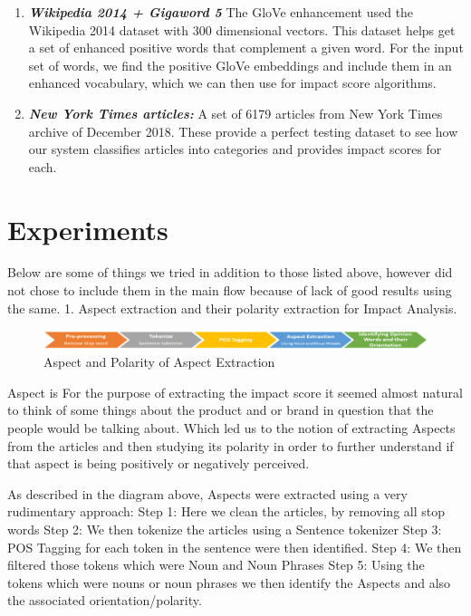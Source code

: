 \documentclass[paper=a4, fontsize=11pt]{scrartcl}
\numberwithin{equation}{section}		%
\numberwithin{figure}{section}			%
\numberwithin{table}{section}				%
\begin{document}
\begin {enumerate}
\item \textbf{\textit{Wikipedia 2014 + Gigaword 5}}
The GloVe enhancement used the Wikipedia 2014 dataset with 300 dimensional vectors. This dataset helps get a set of enhanced positive words that complement a given word. For the input set of words, we find the positive GloVe embeddings and include them in an enhanced vocabulary, which we can then use for impact score algorithms.

\item \textbf{\textit{New York Times articles:}}
A set of 6179 articles from New York Times archive of December 2018. These provide a perfect testing dataset to see how our system classifies articles into categories and provides impact scores for each.

\end {enumerate}

\section{Experiments}
Below are some of things we tried in addition to those listed above, however did not chose to include them in the main flow because of lack of good results using the same.
1. Aspect extraction and their polarity extraction for Impact Analysis.
\begin{figure}[H]
	\centering
 	 \includegraphics[width=0.6\linewidth]{Aspect_Extraction.png}
	  \caption{Aspect and Polarity of Aspect Extraction}
 	 \label{fig:Aspect Extraction.png}
\end{figure}
Aspect is
For the purpose of extracting the impact score it seemed almost natural to think of some things about the product and or brand in question that the people would be talking about. Which led us to the notion of extracting Aspects from the articles and then studying its polarity in order to further understand if that aspect is being positively or negatively perceived.

As described in the diagram above, Aspects were extracted using a very rudimentary approach:
{Step 1: Here we clean the articles, by removing all stop words}
{Step 2: We then tokenize the articles using a Sentence tokenizer}
{Step 3: POS Tagging for each token in the sentence were then identified.}
{Step 4: We then filtered those tokens which were Noun and Noun Phrases}
{Step 5: Using the tokens which were nouns or noun phrases we then identify the Aspects and also the associated orientation/polarity.}
\end{document}
